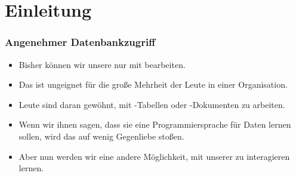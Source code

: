 \documentclass[aspectratio=169,mathserif,notheorems]{beamer}%
\subtitle{19.~Fabrik-Datenbank:~Tabellen und Sichten in LibreOffice Base}%
\begin{document}
%
%
\startPresentation%
%
\section{Einleitung}%
%
\begin{frame}%
\frametitle{Angenehmer Datenbankzugriff}%
%
\begin{itemize}%
\item Bisher können wir unsere  nur mit  bearbeiten.%
%
\item<2-> Das ist ungeignet für die große Mehrheit der Leute in einer Organisation.%
%
\item<3-> Leute sind daran gewöhnt, mit \microsoftExcel-Tabellen oder \microsoftWord-Dokumenten zu arbeiten.%
%
\item<4-> Wenn wir ihnen sagen, dass sie eine Programmiersprache für Daten lernen sollen, wird das auf wenig Gegenliebe stoßen.%
%
\item<5-> Aber nun werden wir eine andere Möglichkeit, mit unserer  zu interagieren lernen.%
\end{itemize}%
\end{frame}%
%
%
\end{document}
